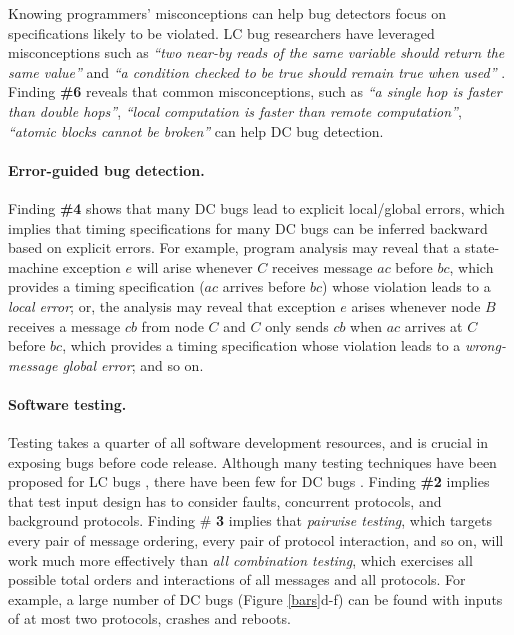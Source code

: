 Knowing programmers' misconceptions can help bug detectors
focus on specifications likely to be violated.  LC bug
researchers have leveraged misconceptions such as {\it ``two near-by
  reads of the same variable should return the same value''}
\cite{avio.asplos06} and {\it ``a condition checked to be true should
  remain true when used''} \cite{ifcon.hpca14}.
%
%
Finding {\bf \#6} reveals that common misconceptions, such
as {\it ``a single hop is faster than double hops''}, 
{\it ``local computation is faster than remote computation''}, 
{\it ``atomic blocks cannot be broken''}
can help DC bug detection.


\paragraph{Error-guided bug detection.} 

Finding {\bf \#4} shows that many DC bugs lead to explicit
local/global errors, which implies that timing specifications for many
DC bugs can be inferred backward based on explicit errors.  For
example, program analysis may reveal that a state-machine exception
$e$ will arise whenever $C$ receives message $ac$ before $bc$, which
provides a timing specification ($ac$ arrives before $bc$)
whose violation leads to a {\it local error}; or, the analysis may
reveal that exception $e$ arises whenever node $B$ receives a message
$cb$ from node $C$ and $C$ only sends $cb$ when $ac$ arrives at
$C$ before $bc$, which provides a timing specification whose
violation leads to a {\it wrong-message global error}; and so on.  



\paragraph{Software testing.}

Testing takes a quarter of all software development resources,
and is crucial in exposing bugs before code
release.  Although many testing techniques have been proposed for LC
bugs \cite{madan.asplos10,
ctrigger.asplos09, racefuzzer}, there have been few for
DC bugs \cite{jcute}.
%
%
Finding {\bf \#2} implies that test input design has to consider
faults, concurrent protocols, and background protocols. Finding \#{\bf
  3} implies that {\it pairwise testing}, which targets every pair of
message ordering, every pair of protocol interaction, and so on, will
work much more effectively than {\it all combination testing}, which
exercises all possible total orders and interactions of all
messages and all protocols.
%
For example, a large number of DC bugs (Figure \ref{bars}d-f) can be 
found with inputs of at most two protocols, crashes and reboots.


